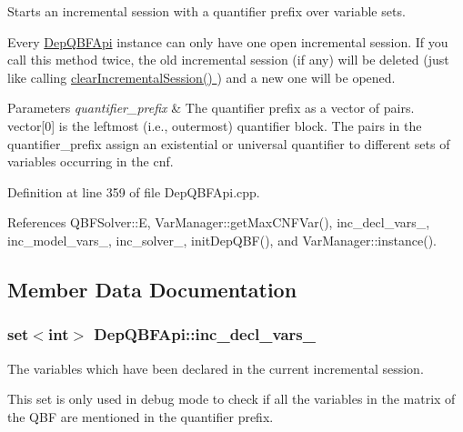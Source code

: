 Starts an incremental session with a quantifier prefix over variable sets. 

Every \hyperlink{classDepQBFApi}{Dep\-Q\-B\-F\-Api} instance can only have one open incremental session. If you call this method twice, the old incremental session (if any) will be deleted (just like calling \hyperlink{classDepQBFApi_a4cacfbb0e933d8a66bd24ce5b71ea623}{clear\-Incremental\-Session() }) and a new one will be opened.


\begin{DoxyParams}{Parameters}
{\em quantifier\-\_\-prefix} & The quantifier prefix as a vector of pairs. vector\mbox{[}0\mbox{]} is the leftmost (i.\-e., outermost) quantifier block. The pairs in the quantifier\-\_\-prefix assign an existential or universal quantifier to different sets of variables occurring in the cnf. \\
\hline
\end{DoxyParams}


Definition at line 359 of file Dep\-Q\-B\-F\-Api.\-cpp.



References Q\-B\-F\-Solver\-::\-E, Var\-Manager\-::get\-Max\-C\-N\-F\-Var(), inc\-\_\-decl\-\_\-vars\-\_\-, inc\-\_\-model\-\_\-vars\-\_\-, inc\-\_\-solver\-\_\-, init\-Dep\-Q\-B\-F(), and Var\-Manager\-::instance().



\subsection{Member Data Documentation}
\hypertarget{classDepQBFApi_a28c913cc99ac6671a2f86dafe1c9f55a}{
\subsubsection[{inc\-\_\-decl\-\_\-vars\-\_\-}]{\setlength{\rightskip}{0pt plus 5cm}set$<$int$>$ Dep\-Q\-B\-F\-Api\-::inc\-\_\-decl\-\_\-vars\-\_\-\hspace{0.3cm}{\ttfamily [protected]}}}\label{classDepQBFApi_a28c913cc99ac6671a2f86dafe1c9f55a}


The variables which have been declared in the current incremental session. 

This set is only used in debug mode to check if all the variables in the matrix of the Q\-B\-F are mentioned in the quantifier prefix. 

